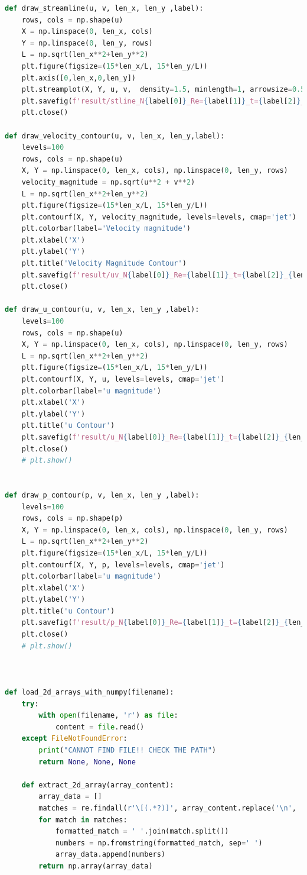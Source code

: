 \documentclass[12pt]{article}
\begin{document}
\begin{scriptsize}
\begin{lstlisting}[language=python,caption={N-S Cylinder Solver}]
def draw_streamline(u, v, len_x, len_y ,label):
    rows, cols = np.shape(u)  
    X = np.linspace(0, len_x, cols)
    Y = np.linspace(0, len_y, rows)
    L = np.sqrt(len_x**2+len_y**2)
    plt.figure(figsize=(15*len_x/L, 15*len_y/L))
    plt.axis([0,len_x,0,len_y])
    plt.streamplot(X, Y, u, v,  density=1.5, minlength=1, arrowsize=0.5)
    plt.savefig(f'result/stline_N{label[0]}_Re={label[1]}_t={label[2]}_{len_x}x{len_y}.png')
    plt.close()

def draw_velocity_contour(u, v, len_x, len_y,label):
    levels=100 
    rows, cols = np.shape(u)
    X, Y = np.linspace(0, len_x, cols), np.linspace(0, len_y, rows)
    velocity_magnitude = np.sqrt(u**2 + v**2)
    L = np.sqrt(len_x**2+len_y**2)
    plt.figure(figsize=(15*len_x/L, 15*len_y/L))
    plt.contourf(X, Y, velocity_magnitude, levels=levels, cmap='jet')
    plt.colorbar(label='Velocity magnitude')
    plt.xlabel('X')
    plt.ylabel('Y')
    plt.title('Velocity Magnitude Contour')
    plt.savefig(f'result/uv_N{label[0]}_Re={label[1]}_t={label[2]}_{len_x}x{len_y}.png')
    plt.close()

def draw_u_contour(u, v, len_x, len_y ,label):
    levels=100
    rows, cols = np.shape(u)
    X, Y = np.linspace(0, len_x, cols), np.linspace(0, len_y, rows)
    L = np.sqrt(len_x**2+len_y**2)
    plt.figure(figsize=(15*len_x/L, 15*len_y/L))
    plt.contourf(X, Y, u, levels=levels, cmap='jet')
    plt.colorbar(label='u magnitude')
    plt.xlabel('X')
    plt.ylabel('Y')
    plt.title('u Contour')
    plt.savefig(f'result/u_N{label[0]}_Re={label[1]}_t={label[2]}_{len_x}x{len_y}.png')
    plt.close()
    # plt.show()


def draw_p_contour(p, v, len_x, len_y ,label):
    levels=100
    rows, cols = np.shape(p)
    X, Y = np.linspace(0, len_x, cols), np.linspace(0, len_y, rows)
    L = np.sqrt(len_x**2+len_y**2)
    plt.figure(figsize=(15*len_x/L, 15*len_y/L))
    plt.contourf(X, Y, p, levels=levels, cmap='jet')
    plt.colorbar(label='u magnitude')
    plt.xlabel('X')
    plt.ylabel('Y')
    plt.title('u Contour')
    plt.savefig(f'result/p_N{label[0]}_Re={label[1]}_t={label[2]}_{len_x}x{len_y}.png')
    plt.close()
    # plt.show()



def load_2d_arrays_with_numpy(filename):
    try:
        with open(filename, 'r') as file:
            content = file.read()
    except FileNotFoundError:
        print("CANNOT FIND FILE!! CHECK THE PATH")
        return None, None, None

    def extract_2d_array(array_content):
        array_data = []
        matches = re.findall(r'\[(.*?)]', array_content.replace('\n', ''), re.DOTALL)
        for match in matches:
            formatted_match = ' '.join(match.split())
            numbers = np.fromstring(formatted_match, sep=' ')
            array_data.append(numbers)
        return np.array(array_data)


\end{lstlisting}
\end{scriptsize}
\end{document}
